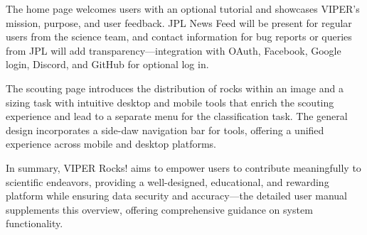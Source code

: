 \documentclass{article}
\begin{document}
The home page welcomes users with an optional tutorial and showcases VIPER’s mission, purpose, and user feedback. JPL News Feed will be present for regular users from the science team, and contact information for bug reports or queries from JPL will add transparency—integration with OAuth, Facebook, Google login, Discord, and GitHub for optional log in.

The scouting page introduces the distribution of rocks within an image and a sizing task with intuitive desktop and mobile tools that enrich the scouting experience and lead to a separate menu for the classification task. The general design incorporates a side-daw navigation bar for tools, offering a unified experience across mobile and desktop platforms.

In summary, VIPER Rocks! aims to empower users to contribute meaningfully to scientific endeavors, providing a well-designed, educational, and rewarding platform while ensuring data security and accuracy—the detailed user manual supplements this overview, offering comprehensive guidance on system functionality.
\end{document}
